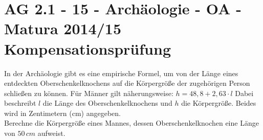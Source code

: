 \section{AG 2.1 - 15 - Archäologie - OA - Matura 2014/15 Kompensationsprüfung}

\begin{beispiel}[AG 2.1]{1} %
				In der Archäologie gibt es eine empirische Formel, um von der Länge eines entdeckten Oberschenkelknochens auf die Körpergröße der zugehörigen Person schließen zu können.
				Für Männer gilt näherungsweise: $h=48,8+2,63\cdot l$
				Dabei beschreibt $l$ die Länge des Oberschenkelknochens und $h$ die Körpergröße. Beides wird in Zentimetern (cm) angegeben.\\
				
				Berechne die Körpergröße eines Mannes, dessen Oberschenkelknochen eine Länge von $50\,cm$ aufweist.\\
				
\end{beispiel}